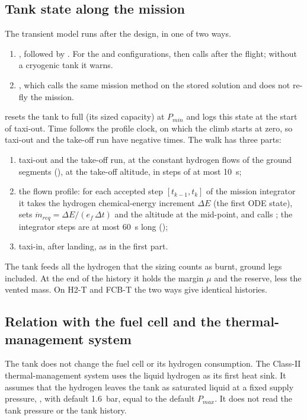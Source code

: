 \documentclass[a4paper,11pt]{article}
\newcommand{\mdot}{\dot m}
\begin{document}
\subsection{Tank state along the mission}\label{sec:track}
The transient model runs after the design, in one of two ways.
\begin{enumerate}
\item {}, followed by
  . For the  and
   configurations,  then calls
   after the flight; without a cryogenic tank it warns.
\item {}, which calls the same mission method
  on the stored solution and does not re-fly the mission.
\end{enumerate}
 resets the tank to full (its sized capacity) at $P_{min}$
and logs this state at the start of taxi-out. Time follows the profile clock, on which the
climb starts at zero, so taxi-out and the take-off run have negative times. The walk has
three parts:
\begin{enumerate}
\item taxi-out and the take-off run, at the constant hydrogen flows of the ground segments
  (), at the take-off altitude, in steps of at most
  \SI{10}{s};
\item the flown profile: for each accepted step $[t_{k-1}, t_k]$ of the mission integrator it
  takes the hydrogen chemical-energy increment $\Delta E$ (the first ODE state), sets
  $\mdot_{req} = \Delta E / (e_f\,\Delta t)$ and the altitude at the mid-point, and calls
  ; the integrator steps are at most \SI{60}{s} long ();
\item taxi-in, after landing, as in the first part.
\end{enumerate}
The tank feeds all the hydrogen that the sizing counts as burnt, ground legs included. At the
end of the history it holds the margin $\mu$ and the reserve, less the vented mass. On H2-T and
FCB-T the two ways give identical histories.

\subsection{Relation with the fuel cell and the thermal-management system}\label{sec:tms}
The tank does not change the fuel cell or its hydrogen consumption. The Class-II
thermal-management system uses the liquid hydrogen as its first heat sink. It assumes that the
hydrogen leaves the tank as saturated liquid at a fixed supply pressure,
, with default \SI{1.6}{bar}, equal to the default
$P_{max}$. It does not read the tank pressure or the tank history.
\end{document}
